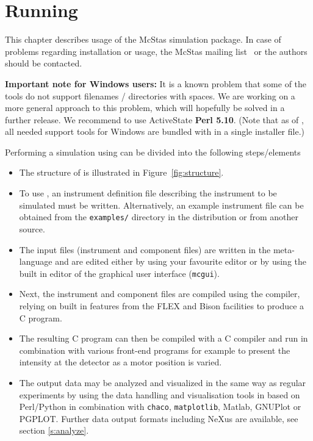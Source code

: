
\chapter{Running \MCS}
\label{c:running}


This chapter describes usage of the McStas simulation package. 
In case of problems regarding installation or usage, the McStas mailing
list~\cite{mcstas_webpage} or the authors should be contacted.

{\bf Important note for Windows users:} It is a known problem that some of
the \MCS tools do not support filenames / directories with spaces.
We are working on a more general approach to this problem, which will
hopefully be solved in a further release. We recommend to use
ActiveState {\bf Perl 5.10}. (Note that as of , all needed
support tools for Windows are bundled with \MCS in a single installer file.)

Performing a simulation using \MCS can be divided into the following
steps/elements
\begin{itemize}
\item{The structure of \MCS is illustrated in
    Figure~\ref{fig:structure}.}
\item{To use \MCS, an instrument
definition file describing the instrument to be simulated must be
written. Alternatively, an example instrument file can be obtained
from the \verb+examples/+ directory in the distribution or from
another source.}
\item{The input files (instrument and component files) are written in the \MCS
meta-language and are edited either by using your favourite editor
or by using the built in editor of the graphical user interface
(\texttt{mcgui}).}
\item{Next, the instrument and component files are compiled using the \MCS
compiler, relying on built in features from the FLEX and Bison facilities to produce a C program.}
\item{The resulting C program can then be
compiled with a C compiler and run in combination with various
front-end programs for example to present the intensity at the
detector as a motor position is varied.}
\item{The output data may be analyzed and visualized in the same way as regular
    experiments by using the data handling and visualisation tools in \MCS
    based on Perl/Python in combination with \verb+chaco+, \verb+matplotlib+,
    Matlab, GNUPlot or PGPLOT. Further data output formats including NeXus
    are available, see section \ref{s:analyze}.}
\end{itemize}


